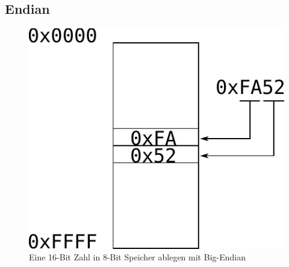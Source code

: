 \subsection{Endian}

\begin{figure}[h!]
	\centering
	\includegraphics[scale=0.5]{../fig/endian.pdf}
	\caption{Eine 16-Bit Zahl in 8-Bit Speicher ablegen mit Big-Endian}
\end{figure}


